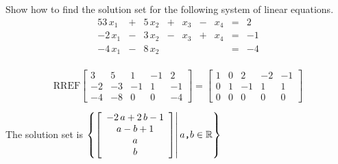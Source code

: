 
\begin{exerciseStatement}


Show how to find the solution set for the following system of linear equations. 
\begin{alignat*}{5} 3 \, x_{1} &+& 5 \, x_{2} &+& x_{3} &-& x_{4} &=& 2 \\-2 \, x_{1} &-& 3 \, x_{2} &-& x_{3} &+& x_{4} &=& -1 \\-4 \, x_{1} &-& 8 \, x_{2} & &  & &  &=& -4 \\ \end{alignat*}
            


\end{exerciseStatement}
    
\begin{exerciseAnswer} 
\[\mathrm{RREF} \left[\begin{array}{cccc|c}
3 & 5 & 1 & -1 & 2 \\
-2 & -3 & -1 & 1 & -1 \\
-4 & -8 & 0 & 0 & -4
\end{array}\right]  =  \left[\begin{array}{cccc|c}
1 & 0 & 2 & -2 & -1 \\
0 & 1 & -1 & 1 & 1 \\
0 & 0 & 0 & 0 & 0
\end{array}\right] \]

The solution set is \( \left\{ \left[\begin{array}{c}
-2 \, a + 2 \, b - 1 \\
a - b + 1 \\
a \\
b
\end{array}\right] \middle|\,a\text{\texttt{,}}b\in\mathbb{R}\right\} \)


\end{exerciseAnswer}
    
